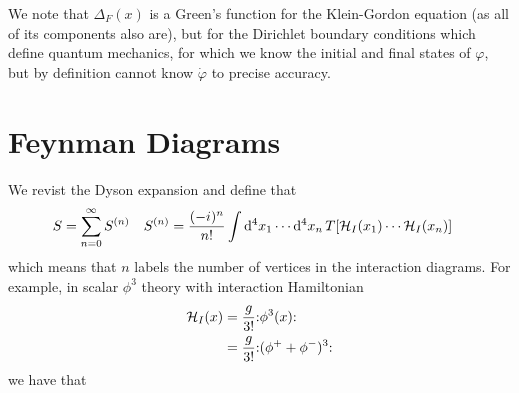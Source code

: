 \documentclass[notes.tex]{subfiles}
\begin{document}
We note that $\Delta_F(x)$ is a Green's function for the Klein-Gordon equation (as all of its components also are), but for the Dirichlet boundary conditions which define quantum mechanics, for which we know the initial and final states of $\varphi$, but by definition cannot know $\dot\varphi$ to precise accuracy.

\section{Feynman Diagrams}
We revist the Dyson expansion and define that
\begin{align*}
	S&=\sum_{n=0}^\infty S^{(n)} & S^{(n)} &= \frac{(-i)^n}{n!} \int\dd[4]{x_1}\cdots\dd[4]{x_n} T\qty[\mathcal{H}_I(x_1)\cdots \mathcal{H}_I(x_n)]
\end{align*}
which means that $n$ labels the number of vertices in the interaction diagrams.
For example, in scalar $\phi^3$ theory with interaction Hamiltonian
\begin{align*}
	\mathcal{H}_I (x) &= \frac{g}{3!} \mathbf{:}\phi^3(x)\mathbf{:}\\
	&= \frac{g}{3!}\mathbf{:}(\phi^+ + \phi^-)^3\mathbf{:}
\end{align*}
we have that
\end{document}
